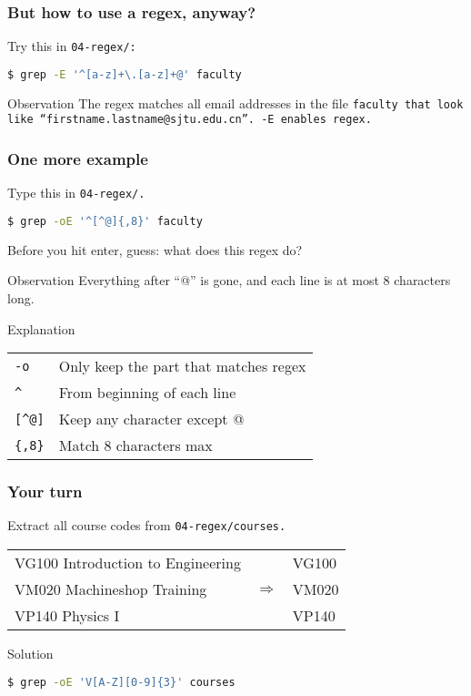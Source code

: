 \begin{frame}[fragile]
\frametitle{But how to use a regex, anyway?}
Try this in \tt{04-regex/}:
\begin{lstlisting}[language=bash]
$ grep -E '^[a-z]+\.[a-z]+@' faculty
\end{lstlisting}
\pause
\begin{block}{Observation}
    The regex matches all email addresses in the file \tt{faculty}
    that look like ``firstname.lastname@sjtu.edu.cn''.
    \newline \newline
    \tt{-E} enables regex.
\end{block}
\end{frame}

\begin{frame}[fragile]
\frametitle{One more example}
Type this in \tt{04-regex/}.
\begin{lstlisting}[language=bash]
$ grep -oE '^[^@]{,8}' faculty
\end{lstlisting}
Before you hit enter, guess: what does this regex do?
\pause
\begin{block}{Observation}
    Everything after ``@'' is gone, and each line is at most 8 characters long.
\end{block}
\begin{block}{Explanation}
    \begin{tabular}{ll}
        \verb|-o|   & Only keep the part that matches regex \\
        \verb|^|    & From beginning of each line \\
        \verb|[^@]| & Keep any character except @ \\
        \verb|{,8}| & Match 8 characters max \\
    \end{tabular}
\end{block}
\end{frame}

\begin{frame}[fragile]
\frametitle{Your turn}
Extract all course codes from \tt{04-regex/courses}. \newline

\begin{example}
    \begin{tabular}{lcl}
        VG100 Introduction to Engineering & & VG100 \\
        VM020 Machineshop Training & $\Longrightarrow$ & VM020 \\
        VP140 Physics I & & VP140
    \end{tabular}
\end{example}
\pause
\begin{block}{Solution}
\begin{lstlisting}[language=bash]
$ grep -oE 'V[A-Z][0-9]{3}' courses
\end{lstlisting}
\end{block}
\end{frame}

